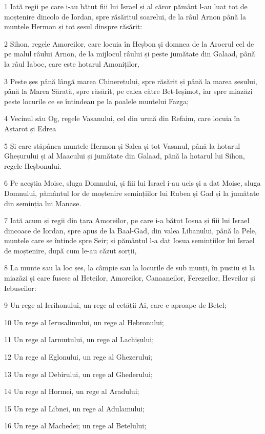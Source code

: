 \par 1 Iată regii pe care i-au bătut fiii lui Israel și al căror pământ l-au luat tot de moștenire dincolo de Iordan, spre răsăritul soarelui, de la râul Arnon până la muntele Hermon și tot șesul dinspre răsărit:
\par 2 Sihon, regele Amoreilor, care locuia în Heșbon și domnea de la Aroerul cel de pe malul râului Arnon, de la mijlocul râului și peste jumătate din Galaad, până la râul Iaboc, care este hotarul Amoniților,
\par 3 Peste șes până lângă marea Chineretului, spre răsărit și până la marea șesului, până la Marea Sărată, spre răsărit, pe calea către Bet-Ieșimot, iar spre miazăzi peste locurile ce se întindeau pe la poalele muntelui Fazga;
\par 4 Vecinul său Og, regele Vasanului, cel din urmă din Refaim, care locuia în Aștarot și Edrea
\par 5 Și care stăpânea muntele Hermon și Salca și tot Vasanul, până la hotarul Gheșurului și al Maacului și jumătate din Galaad, până la hotarul lui Sihon, regele Heșbonului.
\par 6 Pe aceștia Moise, sluga Domnului, și fiii lui Israel i-au ucis și a dat Moise, sluga Domnului, pământul lor de moștenire semințiilor lui Ruben și Gad și la jumătate din seminția lui Manase.
\par 7 Iată acum și regii din țara Amoreilor, pe care i-a bătut Iosua și fiii lui Israel dincoace de Iordan, spre apus de la Baal-Gad, din valea Libanului, până la Pele, muntele care se întinde spre Seir; și pământul l-a dat Iosua semințiilor lui Israel de moștenire, după cum le-au căzut sorții,
\par 8 La munte sau la loc șes, la câmpie sau la locurile de sub munți, în pustiu și la miazăzi și care fusese al Heteilor, Amoreilor, Canaaneilor, Ferezeilor, Heveilor și Iebuseilor:
\par 9 Un rege al Ierihonului, un rege al cetății Ai, care e aproape de Betel;
\par 10 Un rege al Ierusalimului, un rege al Hebronului;
\par 11 Un rege al Iarmutului, un rege al Lachișului;
\par 12 Un rege al Eglonului, un rege al Ghezerului;
\par 13 Un rege al Debirului, un rege al Ghederului;
\par 14 Un rege al Hormei, un rege al Aradului;
\par 15 Un rege al Libnei, un rege al Adulamului;
\par 16 Un rege al Machedei; un rege al Betelului;

